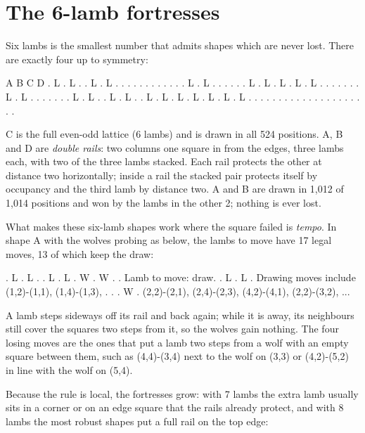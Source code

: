 \documentclass[11pt,a4paper]{article}
\begin{document}
\section*{The 6-lamb fortresses}

Six lambs is the smallest number that admits shapes which are never lost. There
are exactly four up to symmetry:

\begin{board}
   A               B               C               D
   . L . L .       . L . L .       . . . . .       . . . . .
   . L . L .       . . . . .       L . L . L       . L . L .
   . . . . .       . L . L .       . . . . .       . L . L .
   . L . L .       . L . L .       L . L . L       . L . L .
   . . . . .       . . . . .       . . . . .       . . . . .
\end{board}

C is the full even-odd lattice (6 lambs) and is drawn in all 524 positions. A, B
and D are \emph{double rails}: two columns one square in from the edges, three
lambs each, with two of the three lambs stacked. Each rail protects the other at
distance two horizontally; inside a rail the stacked pair protects itself by
occupancy and the third lamb by distance two. A and B are drawn in 1{,}012 of
1{,}014 positions and won by the lambs in the other 2; nothing is ever lost.

What makes these six-lamb shapes work where the square failed is \emph{tempo}.
In shape A with the wolves probing as below, the lambs to move have 17 legal
moves, 13 of which keep the draw:

\begin{board}
   . L . L .
   . L . L .
   W . W . .        Lamb to move: draw.
   . L . L .        Drawing moves include (1,2)-(1,1), (1,4)-(1,3),
   . . . W .        (2,2)-(2,1), (2,4)-(2,3), (4,2)-(4,1), (2,2)-(3,2), ...
\end{board}

A lamb steps sideways off its rail and back again; while it is away, its
neighbours still cover the squares two steps from it, so the wolves gain nothing.
The four losing moves are the ones that put a lamb two steps from a wolf with an
empty square between them, such as (4,4)-(3,4) next to the wolf on (3,3) or
(4,2)-(5,2) in line with the wolf on (5,4).

Because the rule is local, the fortresses grow: with 7 lambs the extra lamb
usually sits in a corner or on an edge square that the rails already protect, and
with 8 lambs the most robust shapes put a full rail on the top edge:
\end{document}
